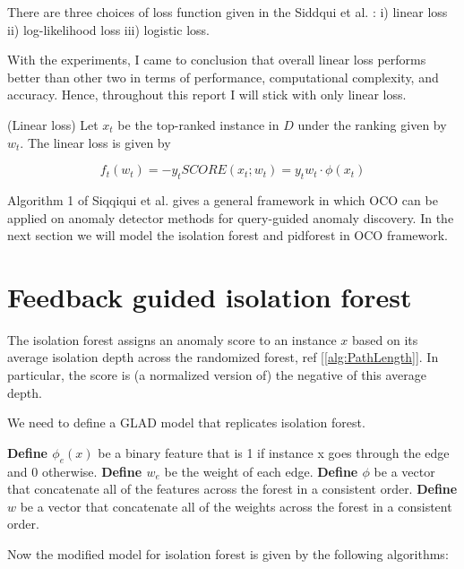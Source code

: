 There are three choices of loss function given in the Siddqui et al. \cite{10.1145/3219819.3220083}: i) linear loss ii) log-likelihood loss iii) logistic loss. 

With the experiments, I came to conclusion that overall linear loss performs better than other two in terms of performance, computational complexity, and accuracy. Hence, throughout this report I will stick with only linear loss.

\begin{defn}
    \label{defn:linear-loss}
    (Linear loss)
    Let $x_t$ be the top-ranked instance in $D$ under the ranking given by $w_t$. The linear loss is given by 

    \vspace{-2em}
    \begin{equation}
        \label{eq:linear-loss}
        f_t(w_t) = -y_t SCORE(x_t;w_t) = y_t w_t \cdot \phi (x_t)
    \end{equation}
\end{defn}

Algorithm 1 of Siqqiqui et al. \cite{10.1145/3219819.3220083} gives a general framework in which OCO can be applied on anomaly detector methods for query-guided anomaly discovery. In the next section we will model the isolation forest and pidforest in OCO framework.


\section{Feedback guided isolation forest}
\label{sec:feedback-guided-iforest}

The isolation forest assigns an anomaly score to an instance $x$ based on its average isolation depth across the randomized forest, ref [\ref{alg:PathLength}]. 
In particular, the score is (a normalized version of) the negative of
this average depth.

We need to define a GLAD model that replicates isolation forest.

\textbf{Define $\phi_e(x)$} be a binary feature that is 1 if instance x goes through the edge and 0 otherwise.
\textbf{Define $w_e$} be the weight of each edge.
\textbf{Define $\phi$}  be a vector that concatenate all of the features across the forest in a consistent order.
\textbf{Define $w$}  be a vector that concatenate all of the weights across the forest in a consistent order.

Now the modified model for isolation forest is given by the following algorithms:



